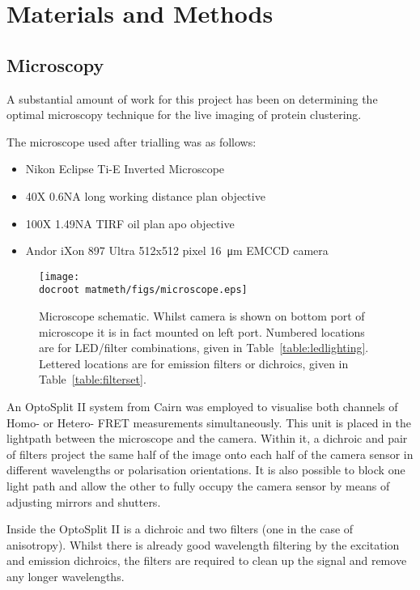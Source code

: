 \documentclass[../main.tex]{subfiles}
\begin{document}
\section{Materials and Methods}

\subsection{Microscopy}

A substantial amount of work for this project has been on determining the optimal microscopy technique for the live imaging of protein clustering.

The microscope used after trialling was as follows:

\begin{itemize}
\item{Nikon Eclipse Ti-E Inverted Microscope}
\item{40X 0.6NA long working distance plan objective}
\item{100X 1.49NA TIRF oil plan apo objective}
\item{Andor iXon 897 Ultra 512x512 pixel \SI{16}{\micro\meter} EMCCD camera}
\end{itemize}

\begin{figure}[h!]
\begin{center}
\texttt{[image: \\docroot matmeth/figs/microscope.eps]}
\caption[Microscope schematic]{Microscope schematic. Whilst camera is shown on bottom port of microscope it is in fact mounted on left port. Numbered locations are for LED/filter combinations, given in Table~\ref{table:ledlighting}. Lettered locations are for emission filters or dichroics,  given in Table~\ref{table:filterset}.}
\label{fig:microscope}
\end{center}
\end{figure}

An OptoSplit II system from Cairn was employed to visualise both channels of Homo- or Hetero- FRET measurements simultaneously. This unit is placed in the lightpath between the microscope and the camera. Within it, a dichroic and pair of filters project the same half of the image onto each half of the camera sensor in different wavelengths or polarisation orientations. It is also possible to block one light path and allow the other to fully occupy the camera sensor by means of adjusting mirrors and shutters.

Inside the OptoSplit II is a dichroic and two filters (one in the case of anisotropy). Whilst there is already good wavelength filtering by the excitation and emission dichroics, the filters are required to clean up the signal and remove any longer wavelengths.
\end{document}
